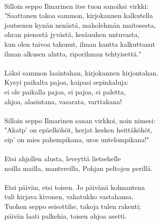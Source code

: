                                                                   \\
Silloin seppo Ilmarinen itse tuon sanoiksi virkki:                \\
"Saattanen takoa sammon, kirjokannen kalkutella                   \\
joutsenen kynän nenästä, maholehmän maitosesta,                   \\
ohran pienestä jyvästä, kesäuuhen untuvasta,                      \\
kun olen taivoa takonut, ilman kantta kalkuttanut                 \\
ilman alkusen alutta, riporihman tehtyisettä."                    \\
                                                                  \\
Läksi sammon laaintahan, kirjokannen kirjontahan.                 \\
Kysyi paikalta pajoa, kaipasi sepinkaluja:                        \\
ei ole paikalla pajoa, ei pajoa, ei paletta,                      \\
ahjoa, alasintana, vasarata, varttakana!                          \\
                                                                  \\
Silloin seppo Ilmarinen sanan virkkoi, noin nimesi:               \\
"Akatp' on epäelköhöt, herjat kesken heittäköhöt,                 \\
eip' on mies pahempikana, uros untelompikana!"                    \\
                                                                  \\
Etsi ahjollen alusta, leveyttä lietsehelle                        \\
noilla mailla, mantereilla, Pohjan peltojen perillä.              \\
                                                                  \\
Etsi päivän, etsi toisen. Jo päivänä kolmantena                   \\
tuli kirjava kivonen, vahatukko vastahansa.                       \\
Tuohon seppo seisottihe, takoja tulen rakenti;                    \\
päivän laati palkehia, toisen ahjoa asetti.                       \\
